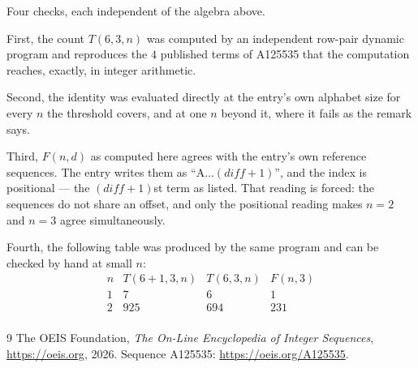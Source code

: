\documentclass[11pt,a4paper]{article}
\theoremstyle{plain}
\theoremstyle{definition}
\begin{document}
Four checks, each independent of the algebra above.

First, the count $T(6,3,n)$ was computed by an independent row-pair dynamic program and
reproduces the $4$ published terms of A125535 that the computation reaches,
exactly, in integer arithmetic.

Second, the identity was evaluated directly at the entry's own alphabet size for every $n$ the
threshold covers, and at one $n$ beyond it, where it fails as the remark says.

Third, $F(n,d)$ as computed here agrees with the entry's own reference sequences. The entry
writes them as ``$\mathrm{A}\dots(\mathit{diff}+1)$'', and the index is positional --- the
$(\mathit{diff}+1)$st term as listed. That reading is forced: the sequences do not share an
offset, and only the positional reading makes $n=2$ and $n=3$ agree simultaneously.

Fourth, the following table was produced by the same program and can be checked by hand at
small $n$:
\[
\begin{array}{rrrr}
n & T(6+1,3,n) & T(6,3,n) & F(n,3) \\ \hline
1 & 7 & 6 & 1 \\
2 & 925 & 694 & 231 \\
\end{array}
\]

\begin{thebibliography}{9}
 The OEIS Foundation, \emph{The On-Line Encyclopedia of Integer Sequences},
\url{https://oeis.org}, 2026. Sequence A125535: \url{https://oeis.org/A125535}.
\end{thebibliography}
\end{document}

